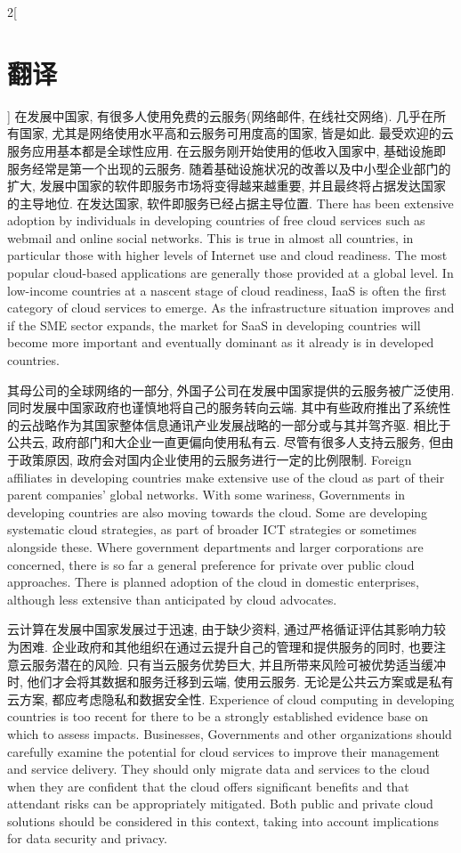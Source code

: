 \documentclass[a4paper, UTF8, 12pt]{article}
\begin{document}
\begin{paracol}{2}[\section{翻译}]
    \switchcolumn*
    在发展中国家, 有很多人使用免费的云服务(网络邮件, 在线社交网络). 几乎在所有国家, 尤其是网络使用水平高和云服务可用度高的国家, 皆是如此. 最受欢迎的云服务应用基本都是全球性应用. 在云服务刚开始使用的低收入国家中, 基础设施即服务经常是第一个出现的云服务. 随着基础设施状况的改善以及中小型企业部门的扩大, 发展中国家的软件即服务市场将变得越来越重要, 并且最终将占据发达国家的主导地位. 在发达国家, 软件即服务已经占据主导位置.
    \switchcolumn
    There has been extensive adoption by individuals in developing countries of free cloud services such as webmail and online social networks. This is true in almost all countries, in particular those with higher levels of Internet use and cloud readiness. The most popular cloud-based applications are generally those provided at a global level. In low-income countries at a nascent stage of cloud readiness, IaaS is often the first category of cloud services to emerge. As the infrastructure situation improves and if the SME sector expands, the market for SaaS in developing countries will become more important and eventually dominant as it already is in developed countries.

    \switchcolumn*
    其母公司的全球网络的一部分, 外国子公司在发展中国家提供的云服务被广泛使用. 同时发展中国家政府也谨慎地将自己的服务转向云端. 其中有些政府推出了系统性的云战略作为其国家整体信息通讯产业发展战略的一部分或与其并驾齐驱. 相比于公共云, 政府部门和大企业一直更偏向使用私有云. 尽管有很多人支持云服务, 但由于政策原因, 政府会对国内企业使用的云服务进行一定的比例限制.
    \switchcolumn
    Foreign affiliates in developing countries make extensive use of the cloud as part of their parent companies’ global networks. With some wariness, Governments in developing countries are also moving towards the cloud. Some are developing systematic cloud strategies, as part of broader ICT strategies or sometimes alongside these. Where government departments and larger corporations are concerned, there is so far a general preference for private over public cloud approaches. There is planned adoption of the cloud in domestic enterprises, although less extensive than anticipated by cloud advocates. 
    
    \switchcolumn*
    云计算在发展中国家发展过于迅速, 由于缺少资料, 通过严格循证评估其影响力较为困难. 企业政府和其他组织在通过云提升自己的管理和提供服务的同时, 也要注意云服务潜在的风险. 只有当云服务优势巨大, 并且所带来风险可被优势适当缓冲时, 他们才会将其数据和服务迁移到云端, 使用云服务. 无论是公共云方案或是私有云方案, 都应考虑隐私和数据安全性.
    \switchcolumn
    Experience of cloud computing in developing countries is too recent for there to be a strongly established evidence base on which to assess impacts. Businesses, Governments and other organizations should carefully examine the potential for cloud services to improve their management and service delivery. They should only migrate data and services to the cloud when they are confident that the cloud offers significant benefits and that attendant risks can be appropriately mitigated. Both public and private cloud solutions should be considered in this context, taking into account implications for data security and privacy. 



\end{paracol}
\end{document}
